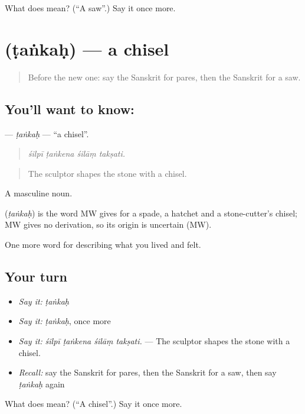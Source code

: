 \begin{tcolorbox}[breakable,colback=teal!4,colframe=teal!35!black,title={Before you move on}]
What does  mean? (\textquotedblleft{}A saw\textquotedblright{}.) Say it once more.
\end{tcolorbox}
\section[\texorpdfstring{\sk{टंकः} (ṭaṅkaḥ)}{टंकः (ṭaṅkaḥ)}]{ (ṭaṅkaḥ) — a chisel}

\label{lesson:SA-C502-tankah}



\begin{quote}
Before the new one: say the Sanskrit for pares, then the Sanskrit for a saw.
\end{quote}

\subsection*{You'll want to know: }
\textbf{} — \emph{ṭaṅkaḥ} — \textquotedblleft{}a chisel\textquotedblright{}.

\begin{quote}
   
\end{quote}

\begin{quote}
\emph{śilpī ṭaṅkena śilāṃ takṣati.}
\end{quote}

\begin{quote}
The sculptor shapes the stone with a chisel.
\end{quote}

A masculine noun.

\begin{cousinweb}
\textbf{} (\emph{ṭaṅkaḥ}) is the word MW gives for a spade, a hatchet and a stone-cutter's chisel; MW gives no derivation, so its origin is uncertain (MW).
\end{cousinweb}

\begin{grammarlens}[title={What you've built}]
One more word for describing what you lived and felt.
\end{grammarlens}

\subsection*{Your turn}
\begin{itemize}
\raggedright
  \item \emph{Say it:} \emph{ṭaṅkaḥ}
  \item \emph{Say it:} \emph{ṭaṅkaḥ}, once more
  \item \emph{Say it:} \emph{śilpī ṭaṅkena śilāṃ takṣati.} — The sculptor shapes the stone with a chisel.
  \item \emph{Recall:} say the Sanskrit for pares, then the Sanskrit for a saw, then say \emph{ṭaṅkaḥ} again
\end{itemize}

\begin{tcolorbox}[breakable,colback=teal!4,colframe=teal!35!black,title={Before you move on}]
What does  mean? (\textquotedblleft{}A chisel\textquotedblright{}.) Say it once more.
\end{tcolorbox}
